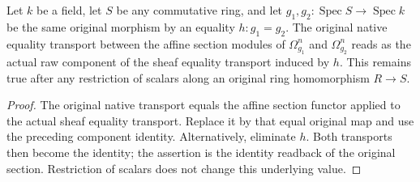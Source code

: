 \begin{lemma}
\label{lem:kn-canonical-affine-native-transport}
\leanok
Let $k$ be a field, let $S$ be any commutative ring, and let
$g_1,g_2:\operatorname{Spec}S\to\operatorname{Spec}k$ be the same original
morphism by an equality $h:g_1=g_2$. The original native equality transport
between the affine section modules of $\Omega^n_{g_1}$ and
$\Omega^n_{g_2}$ reads as the actual raw component of the sheaf equality
transport induced by $h$. This remains true after any restriction of
scalars along an original ring homomorphism $R\to S$.
\end{lemma}
\begin{proof}
The original native transport equals the affine section functor applied
to the actual sheaf equality transport. Replace it by that equal original
map and use the preceding component identity. Alternatively, eliminate
$h$. Both transports then become the identity; the assertion is the
identity readback of the original section. Restriction of scalars does
not change this underlying value.
\end{proof}

